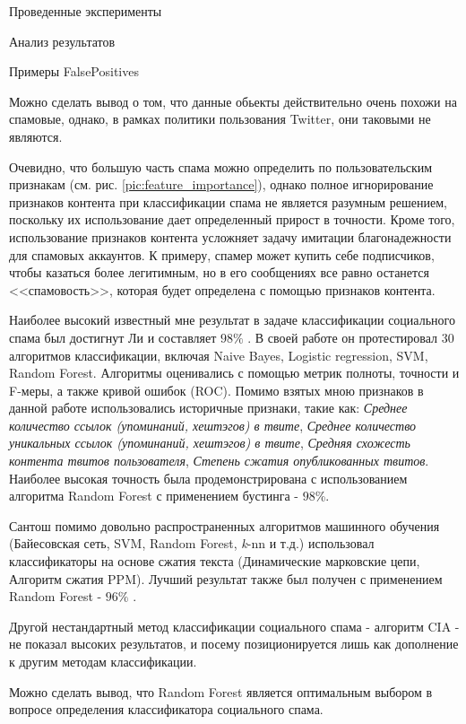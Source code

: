 \begin{section}{Проведенные эксперименты}
\begin{subsection}{Анализ результатов}
\begin{table}[H]
\caption{Примеры FalsePositives}
\label{tab:fp2}
\end{table}


Можно сделать вывод о том, что данные обьекты действительно очень похожи на спамовые, однако, в рамках политики пользования Twitter, они таковыми не являются.

Очевидно, что большую часть спама можно определить по пользовательским признакам (см. рис. \ref{pic:feature_importance}), однако полное игнорирование признаков контента при классификации спама не является разумным решением, поскольку их использование дает определенный прирост в точности. Кроме того, использование признаков контента усложняет задачу имитации благонадежности для спамовых аккаунтов. К примеру, спамер может купить себе подписчиков, чтобы казаться более легитимным, но в его сообщениях все равно останется <<спамовость>>, которая будет определена с помощью признаков контента.

Наиболее высокий известный мне результат в задаче классификации социального спама был достигнут Ли \cite{Lee} и составляет $98\%$ . В своей работе он протестировал 30 алгоритмов классификации, включая Naive Bayes, Logistic regression, SVM, Random Forest. Алгоритмы оценивались с помощью метрик полноты, точности и F-меры, а также кривой ошибок (ROC).  Помимо взятых мною признаков в данной работе использовались историчные признаки, такие как: \textit{Среднее количество ссылок (упоминаний, хештэгов) в твите},  \textit{Среднее количество  уникальных ссылок (упоминаний, хештэгов) в твите}, \textit{Средняя схожесть контента твитов пользователя}, \textit{Степень сжатия опубликованных твитов}. Наиболее высокая точность была продемонстрирована с использованием алгоритма Random Forest с применением бустинга - $98$\%.

Сантош помимо довольно распространенных алгоритмов машинного обучения (Байесовская сеть, SVM, Random Forest, \textit{k}-nn и т.д.) использовал классификаторы на основе сжатия текста (Динамические марковские цепи, Алгоритм сжатия PPM). Лучший результат также был получен с применением Random Forest - $96\%$ \cite{Santos}.

Другой нестандартный метод классификации социального спама -  алгоритм CIA \cite{Chao} - не показал высоких результатов, и посему позиционируется лишь как дополнение к другим методам классификации.

Можно сделать вывод, что Random Forest является оптимальным выбором в вопросе определения классификатора социального спама. 

\end{subsection}









\end{section}
